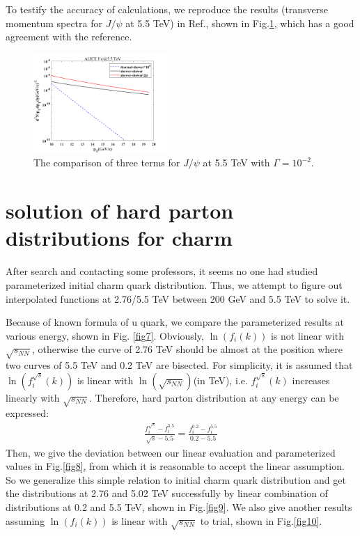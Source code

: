 \documentclass[twocolumn,aps,superscriptaddress,nofootinbib,floatfix]{revtex4}
\begin{document}
To testify the accuracy of calculations, we reproduce the results (transverse momentum spectra for $J/\psi$ at 5.5 TeV) in Ref.\cite{Peng:2011zzd}, shown in Fig.\ref{fig11}, which has a good agreement with the reference.
\begin{figure}[H]
	\includegraphics[width=0.45\textwidth]{repro ref.png}
	\caption{The comparison of three terms for $J/\psi$ at 5.5 TeV with $\Gamma=10^{-2}$.}
	\label{fig11}
\end{figure}


\section{solution of hard parton distributions for charm}
After search and contacting some professors, it seems no one had studied parameterized initial charm quark distribution. Thus, we attempt to figure out interpolated functions at 2.76/5.5 TeV between 200 GeV and 5.5 TeV to solve it.

Because of known formula of u quark, we compare the parameterized results at various energy, shown in Fig. \ref{fig7}. Obviously, $\ln(f_i(k))$ is not linear with $\sqrt{s_{NN}}$, otherwise the curve of 2.76 TeV should be almost at the position where two curves of 5.5 TeV and 0.2 TeV are bisected. For simplicity, it is assumed that $\ln(f_i^{\sqrt{s}}(k))$ is linear with $\ln(\sqrt{s_{NN}})$(in TeV), i.e. $f_i^{\sqrt{s}}(k)$ increases linearly with $\sqrt{s_{NN}}$. Therefore, hard parton distribution at any energy can be expressed:
\begin{eqnarray}
	\frac{f_i^{ \sqrt{s}}-f_i^{ 5.5}}{\sqrt{s}-5.5}=
	\frac{f_i^{ 0.2}-f_i^{ 5.5}}{0.2-5.5} \label{method_fik}
\end{eqnarray} 
Then, we give the deviation between our linear evaluation and parameterized values in Fig.\ref{fig8}, from which it is reasonable to accept the linear assumption. So we generalize this simple relation to initial charm quark distribution and get the distributions at 2.76 and 5.02 TeV successfully by linear combination of distributions at 0.2 and 5.5 TeV, shown in Fig.\ref{fig9}. We also give another results assuming $\ln(f_i(k))$ is linear with $\sqrt{s_{NN}}$ to trial, shown in Fig.\ref{fig10}.
\end{document}
